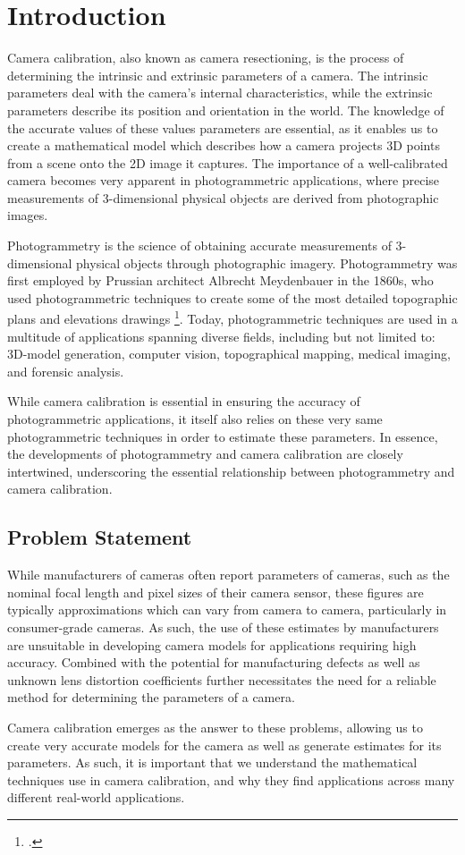 \section{Introduction}

Camera calibration, also known as camera resectioning, is the process of determining the intrinsic and extrinsic parameters of a camera. The intrinsic parameters deal with the camera's internal characteristics, while the extrinsic parameters describe its position and orientation in the world. The knowledge of the accurate values of these values parameters are essential, as it enables us to create a mathematical model which describes how a camera projects 3D points from a scene onto the 2D image it captures. The importance of a well-calibrated camera becomes very apparent in photogrammetric applications, where precise measurements of 3-dimensional physical objects are derived from photographic images.

Photogrammetry is the science of obtaining accurate measurements of 3-dimensional physical objects through photographic imagery. Photogrammetry was first employed by Prussian architect Albrecht Meydenbauer in the 1860s, who used photogrammetric techniques to create some of the most detailed topographic plans and elevations drawings \footcite[][1]{albertzLookBack2007}. Today, photogrammetric techniques are used in a multitude of applications spanning diverse fields, including but not limited to: 3D-model generation, computer vision, topographical mapping, medical imaging, and forensic analysis. 

While camera calibration is essential in ensuring the accuracy of photogrammetric applications, it itself also relies on these very same photogrammetric techniques in order to estimate these parameters. In essence, the developments of photogrammetry and camera calibration are closely intertwined, underscoring the essential relationship between photogrammetry and camera calibration.

\subsection{Problem Statement}

While manufacturers of cameras often report parameters of cameras, such as the nominal focal length and pixel sizes of their camera sensor, these figures are typically approximations which can vary from camera to camera, particularly in consumer-grade cameras. As such, the use of these estimates by manufacturers are unsuitable in developing camera models for applications requiring high accuracy. Combined with the potential for manufacturing defects as well as unknown lens distortion coefficients further necessitates the need for a reliable method for determining the parameters of a camera. 

Camera calibration emerges as the answer to these problems, allowing us to create very accurate models for the camera as well as generate estimates for its parameters. As such, it is important that we understand the mathematical techniques use in camera calibration, and why they find applications across many different real-world applications.
